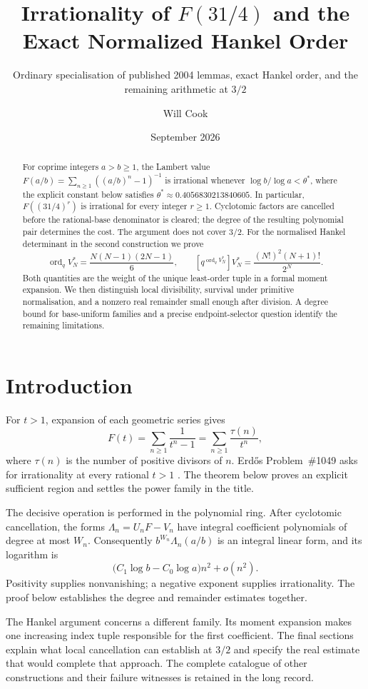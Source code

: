 \documentclass[11pt]{article}
\title{Irrationality of $F(31/4)$ and the\\Exact Normalized Hankel Order}
\subtitle{Ordinary specialisation of published 2004 lemmas, exact Hankel order,
and the remaining arithmetic at $3/2$}
\author{Will Cook}
\date{September 2026}
\begin{document}
\maketitle
\noteprovenance

\begin{abstract}
For coprime integers $a>b\ge1$, the Lambert value
$F(a/b)=\sum_{n\ge1}((a/b)^n-1)^{-1}$ is irrational whenever
$\log b/\log a<\theta^*$, where the explicit constant below satisfies
$\theta^*\approx0.4056830213840605$.
In particular, $F((31/4)^r)$ is irrational for every integer $r\ge1$.
Cyclotomic factors are cancelled before the rational-base denominator is
cleared; the degree of the resulting polynomial pair determines the cost.
The argument does not cover $3/2$.
For the normalised Hankel determinant in the second construction we prove
\[
 \operatorname{ord}_qV_N^*=\frac{N(N-1)(2N-1)}6,
 \qquad [q^{\operatorname{ord}_qV_N^*}]V_N^*
       =\frac{(N!)^2(N+1)!}{2^N}.
\]
Both quantities are the weight of the unique least-order tuple in a formal
moment expansion.  We then distinguish local divisibility, survival under
primitive normalisation, and a nonzero real remainder small enough after
division.  A degree bound for base-uniform families and a precise
endpoint-selector question identify the remaining limitations.
\end{abstract}

\section{Introduction}\label{sec:problem}

For $t>1$, expansion of each geometric series gives
\[
 F(t)=\sum_{n\ge1}\frac1{t^n-1}
     =\sum_{n\ge1}\frac{\tau(n)}{t^n},
\]
where $\tau(n)$ is the number of positive divisors of $n$.
Erd\H{o}s Problem~\#1049 asks for irrationality at every rational $t>1$
\cite[p.~102]{erdos1988}.  The theorem below proves an explicit sufficient
region and settles the power family in the title.

The decisive operation is performed in the polynomial ring.  After
cyclotomic cancellation, the forms $\Lambda_n=U_nF-V_n$ have integral
coefficient polynomials of degree at most $W_n$.  Consequently
$b^{W_n}\Lambda_n(a/b)$ is an integral linear form, and its logarithm is
\[
 \bigl(C_1\log b-C_0\log a\bigr)n^2+o(n^2).
\]
Positivity supplies nonvanishing; a negative exponent supplies irrationality.
The proof below establishes the degree and remainder estimates together.

The Hankel argument concerns a different family.  Its moment expansion makes
one increasing index tuple responsible for the first coefficient.  The final
sections explain what local cancellation can establish at $3/2$ and specify
the real estimate that would complete that approach.  The complete catalogue
of other constructions and their failure witnesses is retained in the long
record.
\end{document}
